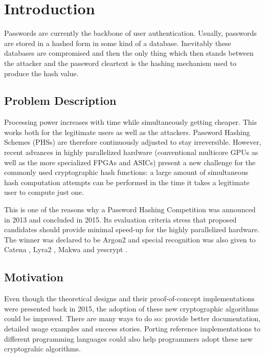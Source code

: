 \chapter{Introduction}
\label{sec:introduction}
Passwords are currently the backbone of user authentication. Usually, passwords are stored in a hashed form in some kind of a database. Inevitably these databases are compromised and then the only thing which then stands between the attacker and the password cleartext is the hashing mechanism used to produce the hash value.

\section{Problem Description}
Processing power increases with time while simultaneously getting cheaper. This works both for the legitimate users as well as the attackers. Password Hashing Schemes (PHSs) are therefore continuously adjusted to stay irreversible. However, recent advances in highly parallelized hardware (conventional multicore GPUs as well as the more specialized FPGAs and ASICs) present a new challenge for the commonly used cryptographic hash functions: a large amount of simultaneous hash computation attempts can be performed in the time it takes a legitimate user to compute just one.

This is one of the reasons why a Password Hashing Competition was announced in 2013 and concluded in 2015. Its evaluation criteria stress that proposed candidates should provide minimal speed-up for the highly parallelized hardware. The winner was declared to be Argon2 and special recognition was also given to Catena \cite{forler:2013:catena}, Lyra2 \cite{andrade:2016:lyra2,marcos:2015:lyra2}, Makwa \cite{pornin:2015:makwa} and yescrypt \cite{peslyak:2015:yescrypt}.

\section{Motivation}
Even though the theoretical designs and their proof-of-concept implementations were presented back in 2015, the adoption of these new cryptographic algorithms could be improved. There are many ways to do so: provide better documentation, detailed usage examples and success stories. Porting reference implementations to different programming languages could also help programmers adopt these new cryptograhic algorithms.

